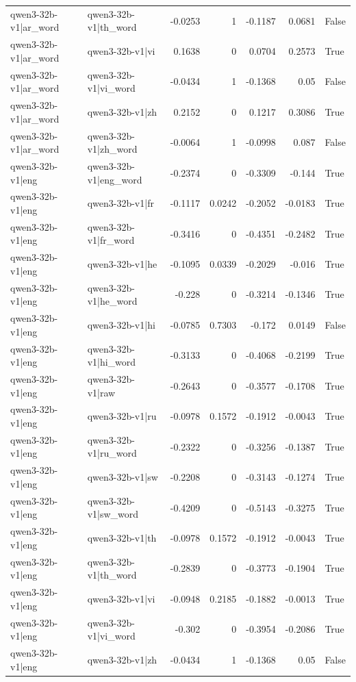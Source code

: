 \begin{table}
\begin{tabular}{l l r r r r l}
qwen3-32b-v1|ar_word & qwen3-32b-v1|th_word & -0.0253 & 1 & -0.1187 & 0.0681 & False \\
qwen3-32b-v1|ar_word & qwen3-32b-v1|vi & 0.1638 & 0 & 0.0704 & 0.2573 & True \\
qwen3-32b-v1|ar_word & qwen3-32b-v1|vi_word & -0.0434 & 1 & -0.1368 & 0.05 & False \\
qwen3-32b-v1|ar_word & qwen3-32b-v1|zh & 0.2152 & 0 & 0.1217 & 0.3086 & True \\
qwen3-32b-v1|ar_word & qwen3-32b-v1|zh_word & -0.0064 & 1 & -0.0998 & 0.087 & False \\
qwen3-32b-v1|eng & qwen3-32b-v1|eng_word & -0.2374 & 0 & -0.3309 & -0.144 & True \\
qwen3-32b-v1|eng & qwen3-32b-v1|fr & -0.1117 & 0.0242 & -0.2052 & -0.0183 & True \\
qwen3-32b-v1|eng & qwen3-32b-v1|fr_word & -0.3416 & 0 & -0.4351 & -0.2482 & True \\
qwen3-32b-v1|eng & qwen3-32b-v1|he & -0.1095 & 0.0339 & -0.2029 & -0.016 & True \\
qwen3-32b-v1|eng & qwen3-32b-v1|he_word & -0.228 & 0 & -0.3214 & -0.1346 & True \\
qwen3-32b-v1|eng & qwen3-32b-v1|hi & -0.0785 & 0.7303 & -0.172 & 0.0149 & False \\
qwen3-32b-v1|eng & qwen3-32b-v1|hi_word & -0.3133 & 0 & -0.4068 & -0.2199 & True \\
qwen3-32b-v1|eng & qwen3-32b-v1|raw & -0.2643 & 0 & -0.3577 & -0.1708 & True \\
qwen3-32b-v1|eng & qwen3-32b-v1|ru & -0.0978 & 0.1572 & -0.1912 & -0.0043 & True \\
qwen3-32b-v1|eng & qwen3-32b-v1|ru_word & -0.2322 & 0 & -0.3256 & -0.1387 & True \\
qwen3-32b-v1|eng & qwen3-32b-v1|sw & -0.2208 & 0 & -0.3143 & -0.1274 & True \\
qwen3-32b-v1|eng & qwen3-32b-v1|sw_word & -0.4209 & 0 & -0.5143 & -0.3275 & True \\
qwen3-32b-v1|eng & qwen3-32b-v1|th & -0.0978 & 0.1572 & -0.1912 & -0.0043 & True \\
qwen3-32b-v1|eng & qwen3-32b-v1|th_word & -0.2839 & 0 & -0.3773 & -0.1904 & True \\
qwen3-32b-v1|eng & qwen3-32b-v1|vi & -0.0948 & 0.2185 & -0.1882 & -0.0013 & True \\
qwen3-32b-v1|eng & qwen3-32b-v1|vi_word & -0.302 & 0 & -0.3954 & -0.2086 & True \\
qwen3-32b-v1|eng & qwen3-32b-v1|zh & -0.0434 & 1 & -0.1368 & 0.05 & False \\

\end{tabular}
\end{table}
